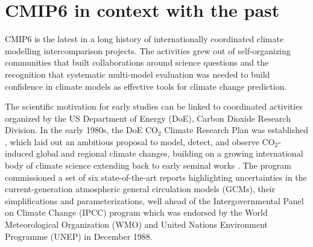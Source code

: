 \documentclass[manuscript]{copernicus}
\newcommand{\mycomment}[1]{}
\begin{document}
\mycomment{
Mention CMIP6 Community MIPs - mentioned in CMIP5 section.
Durack+Tayloretal_CMIP6POverview_GMD-CMIP6SpecialIssue
https://docs.google.com/document/d/1Bxu2djLsB0blUUjr4qtwNpZWqMFXkTQRY8kOR_EJvlA/edit?skip_itp2_check=true&pli=1
}


\section{CMIP6 in context with the past}
\label{sec:cmip6InContext}

CMIP6 is the latest in a long history of internationally coordinated climate modelling intercomparison projects. The activities grew out of self-organizing communities that built collaborations around science questions and the recognition that systematic multi-model evaluation was needed to build confidence in climate models as effective tools for climate change prediction.

The scientific motivation for early studies can be linked to coordinated activities organized by the US Department of Energy (DoE), Carbon Dioxide Research Division. In the early 1980s, the DoE CO$_{2}$ Climate Research Plan was established \citep{riches_co2_1983}, which laid out an ambitious proposal to model, detect, and observe CO$_{2}$-induced global and regional climate changes, building on a growing international body of climate science extending back to early seminal works \citep[e.g.,][]{arrhenius_xxxi_1896,chamberlin_attempt_1899,charney_carbon_1979}. The program commissioned a set of six state-of-the-art reports \citep[e.g.,][]{maccracken_projecting_1985} highlighting uncertainties in the current-generation atmospheric general circulation models (GCMs), their simplifications and parameterizations, well ahead of the Intergovernmental Panel on Climate Change (IPCC) program which was endorsed by the World Meteorological Organization (WMO) and United Nations Environment Programme (UNEP) in December 1988.
\end{document}
